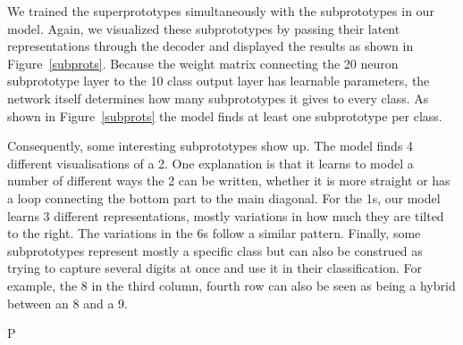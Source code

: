 We trained the superprototypes simultaneously with the subprototypes in our model. Again, we visualized these subprototypes by passing their latent representations through the decoder and displayed the results as shown in Figure~\ref{subprots}. Because the weight matrix connecting the 20 neuron subprototype layer to the 10 class output layer has learnable parameters, the network itself determines how many subprototypes it gives to every class. As shown in Figure~\ref{subprots} the model finds at least one subprototype per class. 

Consequently, some interesting subprototypes show up. The model finds 4 different visualisations of a 2. One explanation is that it learns to model a number of different ways the 2 can be written, whether it is more straight or has a loop connecting the bottom part to the main diagonal. For the 1s, our model learns 3 different representations, mostly variations in how much they are tilted to the right. The variations in the 6s follow a similar pattern. Finally, some subprototypes represent mostly a specific class but can also be construed as trying to capture several digits at once and use it in their classification. For example, the 8 in the third column, fourth row can also be seen as being a hybrid between an 8 and a 9. 

P